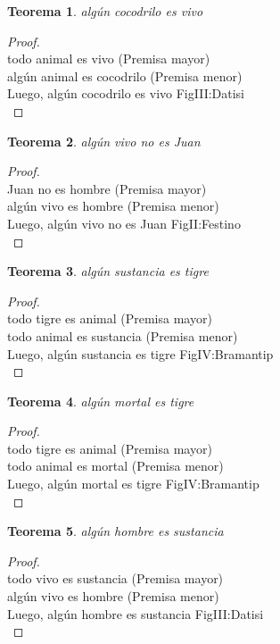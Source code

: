 ﻿\documentclass[12pt]{book}
\newtheorem{theorem}{Teorema}[chapter]
\newtheorem{proof}{Demostración}
\begin{document}
\begin{theorem}
algún cocodrilo es vivo
\label{th: 47}
\end{theorem}\begin{proof}\\todo animal es vivo	 (Premisa mayor) \\algún animal es cocodrilo	 (Premisa menor) \\Luego, algún cocodrilo es vivo	FigIII:Datisi \\ \end{proof}
\begin{theorem}
algún vivo no es Juan
\label{th: 48}
\end{theorem}\begin{proof}\\Juan no es hombre	 (Premisa mayor) \\algún vivo es hombre	 (Premisa menor) \\Luego, algún vivo no es Juan	FigII:Festino \\ \end{proof}
\begin{theorem}
algún sustancia es tigre
\label{th: 49}
\end{theorem}\begin{proof}\\todo tigre es animal	 (Premisa mayor) \\todo animal es sustancia	 (Premisa menor) \\Luego, algún sustancia es tigre	FigIV:Bramantip \\ \end{proof}
\begin{theorem}
algún mortal es tigre
\label{th: 50}
\end{theorem}\begin{proof}\\todo tigre es animal	 (Premisa mayor) \\todo animal es mortal	 (Premisa menor) \\Luego, algún mortal es tigre	FigIV:Bramantip \\ \end{proof}
\begin{theorem}
algún hombre es sustancia
\label{th: 51}
\end{theorem}\begin{proof}\\todo vivo es sustancia	 (Premisa mayor) \\algún vivo es hombre	 (Premisa menor) \\Luego, algún hombre es sustancia	FigIII:Datisi \\ \end{proof}
\end{document}
